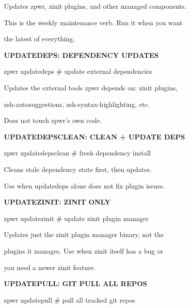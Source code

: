 \documentclass[11pt,a4paper,twoside]{book}
\begin{document}
Updates zpwr, zinit plugins, and other managed components.

This is the weekly maintenance verb. Run it when you want

the latest of everything.


\vspace{12pt}
{\bfseries\color{neonyellow} UPDATEDEPS: DEPENDENCY UPDATES}\vspace{4pt}

\begin{codebox}
zpwr updatedeps                     \# update external dependencies\\
\end{codebox}

Updates the external tools zpwr depends on: zinit plugins,

zsh-autosuggestions, zsh-syntax-highlighting, etc.

Does not touch zpwr's own code.


\vspace{12pt}
{\bfseries\color{neonyellow} UPDATEDEPSCLEAN: CLEAN + UPDATE DEPS}\vspace{4pt}

\begin{codebox}
zpwr updatedepsclean                \# fresh dependency install\\
\end{codebox}

Cleans stale dependency state first, then updates.

Use when updatedeps alone does not fix plugin issues.


\vspace{12pt}
{\bfseries\color{neonyellow} UPDATEZINIT: ZINIT ONLY}\vspace{4pt}

\begin{codebox}
zpwr updatezinit                    \# update zinit plugin manager\\
\end{codebox}

Updates just the zinit plugin manager binary, not the

plugins it manages. Use when zinit itself has a bug or

you need a newer zinit feature.


\vspace{12pt}
{\bfseries\color{neonyellow} UPDATEPULL: GIT PULL ALL REPOS}\vspace{4pt}

\begin{codebox}
zpwr updatepull                     \# pull all tracked git repos\\
\end{codebox}
\end{document}
